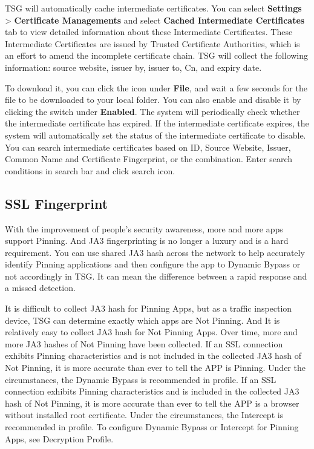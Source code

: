 TSG will automatically cache intermediate certificates. You can select \textbf{Settings} > \textbf{Certificate Managements} 
and select \textbf{Cached Intermediate Certificates} tab to view detailed information about these Intermediate Certificates. 
These Intermediate Certificates are issued by Trusted Certificate Authorities, which is an effort to amend the incomplete certificate chain. 
TSG will collect the following information: source website, issuer by, issuer to, Cn, and expiry date.


To download it, you can click the icon under \textbf{File}, and wait a few seconds for the file to be downloaded to your local folder. 
You can also enable and disable it by clicking the switch under \textbf{Enabled}. 
The system will periodically check whether the intermediate certificate has expired. 
If the intermediate certificate expires, the system will automatically set the status of the intermediate certificate to disable. 
You can search intermediate certificates based on ID, Source Website, Issuer, Common Name and Certificate Fingerprint, or the combination. 
Enter search conditions in search bar and click search icon.

\subsection*{\hypertarget{link:SSL Fingerprint}{SSL Fingerprint}}
\label{sec:decrypt:certificate:fingerprint}

With the improvement of people's security awareness, more and more apps support Pinning. And JA3 fingerprinting is no longer a luxury and is a hard requirement. You can use shared JA3 hash across the network to help accurately identify Pinning applications and then configure the app to Dynamic Bypass or not accordingly in TSG. It can mean the difference between a rapid response and a missed detection. 


It is difficult to collect JA3 hash for Pinning Apps, but as a traffic inspection device, TSG can determine exactly which apps are Not Pinning. And It is relatively easy to collect JA3 hash for Not Pinning Apps. Over time, more and more JA3 hashes of Not Pinning have been collected. If an SSL connection exhibits Pinning characteristics and is not included in the collected JA3 hash of Not Pinning, it is more accurate than ever to tell the APP is Pinning. Under the circumstances, the Dynamic Bypass is recommended in profile. If an SSL connection exhibits Pinning characteristics and is included in the collected JA3 hash of Not Pinning, it is more accurate than ever to tell the APP is a browser without installed root certificate. Under the circumstances, the Intercept is recommended in profile. To configure Dynamic Bypass or Intercept for Pinning Apps, see Decryption Profile.


